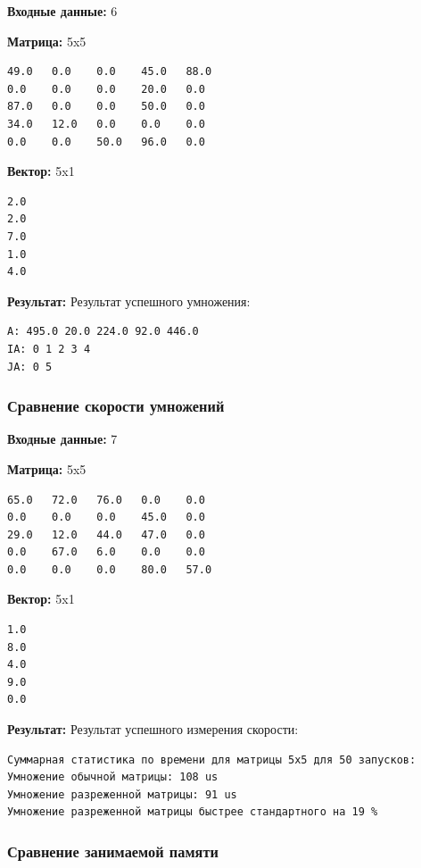 \documentclass[a4paper,12pt]{extarticle}
\begin{document}
\textbf{Входные данные: }
6

\textbf{Матрица: }
5x5

\begin{verbatim}
49.0   0.0    0.0    45.0   88.0 
0.0    0.0    0.0    20.0   0.0   
87.0   0.0    0.0    50.0   0.0  
34.0   12.0   0.0    0.0    0.0 
0.0    0.0    50.0   96.0   0.0
\end{verbatim}

\textbf{Вектор: }
5x1

\begin{verbatim}
2.0
2.0
7.0
1.0
4.0
\end{verbatim}

\textbf{Результат: }
Результат успешного умножения:

\begin{verbatim}
A: 495.0 20.0 224.0 92.0 446.0 
IA: 0 1 2 3 4 
JA: 0 5
\end{verbatim}


\subsubsection{Сравнение скорости умножений}

\textbf{Входные данные: }
7

\textbf{Матрица: }
5x5

\begin{verbatim}
65.0   72.0   76.0   0.0    0.0    
0.0    0.0    0.0    45.0   0.0    
29.0   12.0   44.0   47.0   0.0    
0.0    67.0   6.0    0.0    0.0    
0.0    0.0    0.0    80.0   57.0
\end{verbatim}

\textbf{Вектор: }
5x1

\begin{verbatim}
1.0
8.0
4.0
9.0
0.0
\end{verbatim}

\textbf{Результат: }
Результат успешного измерения скорости: 

\begin{verbatim}
Суммарная статистика по времени для матрицы 5x5 для 50 запусков:
Умножение обычной матрицы: 108 us
Умножение разреженной матрицы: 91 us
Умножение разреженной матрицы быстрее стандартного на 19 %
\end{verbatim}

\subsubsection{Сравнение занимаемой памяти}
\end{document}
